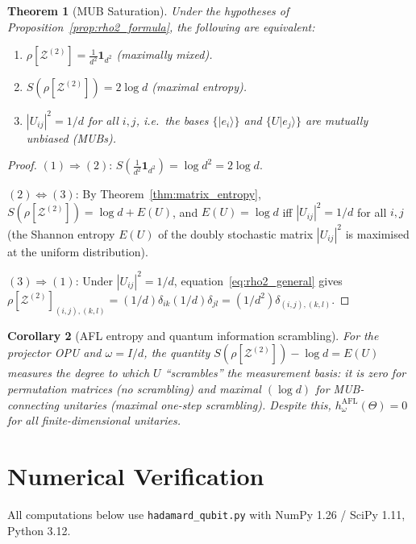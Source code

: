 \documentclass[12pt,a4paper]{article}
\newtheorem{theorem}{Theorem}[section]
\newtheorem{corollary}[theorem]{Corollary}
\begin{document}
\begin{theorem}[MUB Saturation]\label{thm:mub}
Under the hypotheses of Proposition~\ref{prop:rho2_formula}, the following
are equivalent:
\begin{enumerate}
  \item $\rho[\mathcal{Z}^{(2)}]=\frac{1}{d^2}\mathbf{1}_{d^2}$ (maximally mixed).
  \item $S(\rho[\mathcal{Z}^{(2)}])=2\log d$ (maximal entropy).
  \item $|U_{ij}|^2=1/d$ for all $i,j$, i.e.\ the bases
        $\{|e_i\rangle\}$ and $\{U|e_j\rangle\}$ are \emph{mutually
        unbiased (MUBs)}.
\end{enumerate}
\end{theorem}
\begin{proof}
$(1)\Rightarrow(2)$: $S(\frac{1}{d^2}\mathbf{1}_{d^2})=\log d^2=2\log d$.

$(2)\Leftrightarrow(3)$: By Theorem~\ref{thm:matrix_entropy},
$S(\rho[\mathcal{Z}^{(2)}])=\log d+E(U)$, and $E(U)=\log d$ iff
$|U_{ij}|^2=1/d$ for all $i,j$ (the Shannon entropy $E(U)$ of the
doubly stochastic matrix $|U_{ij}|^2$ is maximised at the uniform
distribution).

$(3)\Rightarrow(1)$: Under $|U_{ij}|^2=1/d$,
equation~\eqref{eq:rho2_general} gives
$\rho[\mathcal{Z}^{(2)}]_{(i,j),(k,l)}=(1/d)\delta_{ik}(1/d)\delta_{jl}
=(1/d^2)\delta_{(i,j),(k,l)}$.
\end{proof}

\begin{corollary}[AFL entropy and quantum information scrambling]
\label{cor:scrambling}
For the projector OPU and $\omega=I/d$, the quantity
$S(\rho[\mathcal{Z}^{(2)}])-\log d = E(U)$ measures the degree to which $U$
``scrambles'' the measurement basis: it is zero for permutation matrices
(no scrambling) and maximal $(\log d)$ for MUB-connecting unitaries (maximal
one-step scrambling).  Despite this, $h_\omega^{\mathrm{AFL}}(\Theta)=0$
for all finite-dimensional unitaries.
\end{corollary}

\section{Numerical Verification}
\label{sec:num2}

All computations below use \texttt{hadamard\_qubit.py} with NumPy 1.26 /
SciPy 1.11, Python 3.12.
\end{document}
